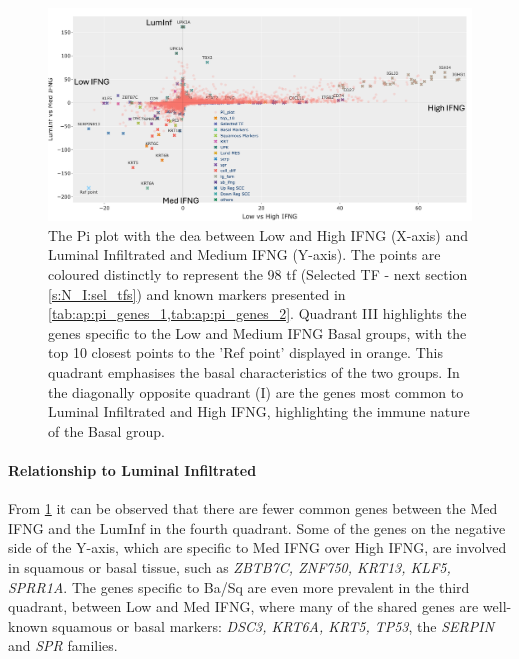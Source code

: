 \begin{figure}[H]    
    \centering
    \includegraphics[width=1.0\textwidth,keepaspectratio]{Sections/ClusteringAnalysis/Resources/discussion/basal_inf_pi.png}
    \caption[Pi plot - for the DEA between the basal groups and immune infiltration]{The Pi plot with the \acrshort{dea} between Low and High IFNG (X-axis) and Luminal Infiltrated and Medium IFNG (Y-axis). The points are coloured distinctly to represent the 98 \acrlong{tf} (Selected TF - next section \cref{s:N_I:sel_tfs}) and known markers presented in \cref{tab:ap:pi_genes_1,tab:ap:pi_genes_2}. Quadrant III highlights the genes specific to the Low and Medium IFNG Basal groups, with the top 10 closest points to the 'Ref point' displayed in orange. This quadrant emphasises the basal characteristics of the two groups. In the diagonally opposite quadrant (I) are the genes most common to Luminal Infiltrated and High IFNG, highlighting the immune nature of the Basal group.}
    \label{fig:cs:pi_basal_inf}
\end{figure}


\paragraph*{Relationship to Luminal Infiltrated}

From \cref{fig:cs:pi_basal_inf} it can be observed that there are fewer common genes between the Med IFNG and the LumInf in the fourth quadrant. Some of the genes on the negative side of the Y-axis, which are specific to Med IFNG over High IFNG, are involved in squamous or basal tissue, such as \textit{ZBTB7C, ZNF750, KRT13, KLF5, SPRR1A}. The genes specific to Ba/Sq are even more prevalent in the third quadrant, between Low and Med IFNG, where many of the shared genes are well-known squamous or basal markers: \textit{DSC3, KRT6A, KRT5, TP53}, the \textit{SERPIN} and \textit{SPR} families.

